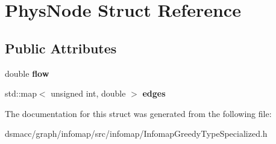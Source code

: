\hypertarget{structPhysNode}{}\section{Phys\+Node Struct Reference}
\label{structPhysNode}
\subsection*{Public Attributes}
\begin{DoxyCompactItemize}
\item 
\mbox{\label{structPhysNode_a731cb96b5f3bdb1db4a27d3f2c0934fd}} 
double {\bfseries flow}
\item 
\mbox{\label{structPhysNode_a6f1830d343e4bf21b0c5d07c450460c4}} 
std\+::map$<$ unsigned int, double $>$ {\bfseries edges}
\end{DoxyCompactItemize}


The documentation for this struct was generated from the following file\+:\begin{DoxyCompactItemize}
\item 
dsmacc/graph/infomap/src/infomap/Infomap\+Greedy\+Type\+Specialized.\+h\end{DoxyCompactItemize}
